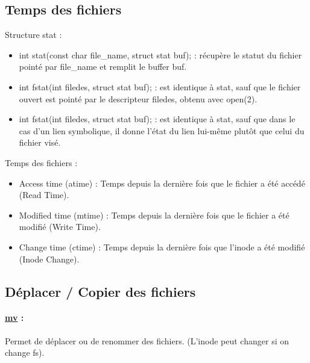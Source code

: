 \documentclass{article}[12pt]
\begin{document}
\subsection{Temps des fichiers}
Structure stat :
\begin{itemize}
	\item int stat(const char \*file\_name, struct stat \*buf); : récupère le statut du fichier pointé par file\_name et remplit le buffer buf.
    \item int fstat(int filedes, struct stat \*buf); : est identique à stat, sauf que le fichier ouvert est pointé par le descripteur filedes, obtenu avec open(2).
    \item int fstat(int filedes, struct stat \*buf);  : est identique à stat, sauf que dans le cas d'un lien symbolique, il donne l'état du lien lui-même plutôt que celui du fichier visé.
\end{itemize}
Temps des fichiers :
\begin{itemize}
\item Access time (atime) : Temps depuis la dernière fois que le fichier a été accédé (Read Time).
\item Modified time (mtime) : Temps depuis la dernière fois que le fichier a été modifié (Write Time).
\item Change time (ctime) : Temps depuis la dernière fois que l'inode a été modifié (Inode Change). 
\end{itemize}
\subsection{Déplacer / Copier des fichiers}
\paragraph{\href{http://jp.barralis.com/linux-man/man1/mv.1.php}{mv} : } Permet de déplacer ou de renommer des fichiers. (L'inode peut changer si on change fs).
\end{document}
